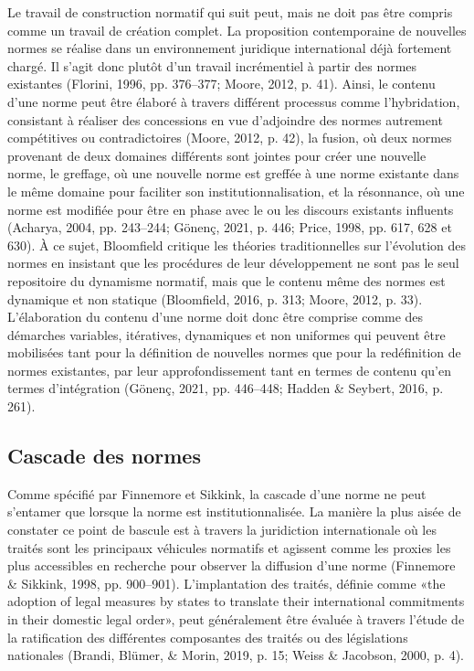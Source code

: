 \documentclass[12pt]{ulaval}
\begin{document}
Le travail de construction normatif qui suit peut, mais ne doit pas être compris comme un travail de création complet. La proposition contemporaine de nouvelles normes se réalise dans un environnement juridique international déjà fortement chargé. Il s'agit donc plutôt d'un travail incrémentiel à partir des normes existantes (Florini, 1996, pp. 376--377; Moore, 2012, p. 41). Ainsi, le contenu d'une norme peut être élaboré à travers différent processus comme l'hybridation, consistant à réaliser des concessions en vue d'adjoindre des normes autrement compétitives ou contradictoires (Moore, 2012, p. 42), la fusion, où deux normes provenant de deux domaines différents sont jointes pour créer une nouvelle norme, le greffage, où une nouvelle norme est greffée à une norme existante dans le même domaine pour faciliter son institutionnalisation, et la résonnance, où une norme est modifiée pour être en phase avec le ou les discours existants influents (Acharya, 2004, pp. 243--244; Gönenç, 2021, p. 446; Price, 1998, pp. 617, 628 et 630). À ce sujet, Bloomfield critique les théories traditionnelles sur l'évolution des normes en insistant que les procédures de leur développement ne sont pas le seul repositoire du dynamisme normatif, mais que le contenu même des normes est dynamique et non statique (Bloomfield, 2016, p. 313; Moore, 2012, p. 33). L'élaboration du contenu d'une norme doit donc être comprise comme des démarches variables, itératives, dynamiques et non uniformes qui peuvent être mobilisées tant pour la définition de nouvelles normes que pour la redéfinition de normes existantes, par leur approfondissement tant en termes de contenu qu'en termes d'intégration (Gönenç, 2021, pp. 446--448; Hadden \& Seybert, 2016, p. 261).

\subsection{Cascade des normes}\label{cascade-des-normes}

Comme spécifié par Finnemore et Sikkink, la cascade d'une norme ne peut s'entamer que lorsque la norme est institutionnalisée. La manière la plus aisée de constater ce point de bascule est à travers la juridiction internationale où les traités sont les principaux véhicules normatifs et agissent comme les proxies les plus accessibles en recherche pour observer la diffusion d'une norme (Finnemore \& Sikkink, 1998, pp. 900--901). L'implantation des traités, définie comme «the adoption of legal measures by states to translate their international commitments in their domestic legal order», peut généralement être évaluée à travers l'étude de la ratification des différentes composantes des traités ou des législations nationales (Brandi, Blümer, \& Morin, 2019, p. 15; Weiss \& Jacobson, 2000, p. 4).
\end{document}
